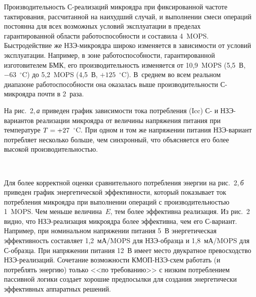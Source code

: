 \begin{multicols}{2}
      
       Производительность С-реализаций микроядра при фиксированной частоте 
тактирования, рассчитанной на наихудший случай, и выполнении смеси операций постоянна для 
всех возможных условий эксплуатации в пределах гарантированной области работоспособности 
и составила 4~MOPS. Быстродействие же НЗЭ-микроядра широко изменяется в зависимости от 
условий эксплуатации. Например, в зоне работоспособности, гарантированной изготовителем 
БМК, его производительность изменяется от 10,9~MOPS (5,5~В, $-63$~$^\circ$C) до 5,2~MOPS 
(4,5~В, $+125$~$^\circ$C). В~среднем во всем реальном диапазоне работоспособности она 
оказалась выше производительности С-мик\-ро\-яд\-ра почти в 2~раза.
       
       На рис.~2,\,\textit{а} приведен график зависимости тока потребления (Icc) С- и НЗЭ-вариантов 
реализации микроядра от величины напряжения питания при температуре 
$T\hm=+27$~$^\circ$C. При одном и том же напряжении питания НЗЭ-ва\-ри\-ант 
потребляет несколько больше, чем синхронный, что объясняется его более высокой 
производительностью.
       
       
      \begin{figure*} %
                   \vspace*{1pt}
 \begin{center}
 \mbox{%
 \epsfxsize=165.286mm
 }
 \end{center}
 \vspace*{-9pt}
      \end{figure*}
      
       Для более корректной оценки сравнительного потребления энергии на рис.~2,\,\textit{б} 
приведен график энергетической эффективности, который показывает ток 
потребления микроядра при выполнении операций с производительностью 1~MOPS. Чем 
меньше величина~$E$, тем более эффективна реализация. Из рис.~2 видно, что 
       НЗЭ-реа\-ли\-за\-ция микроядра более эффективна, чем его С-ва\-ри\-ант. Например, 
при номинальном напряжении питания 5~В энергетическая эффективность составляет 
1,2~мА/MOPS для НЗЭ-образ\-ца и 1,8~мА/MOPS для С-образ\-ца. При напряжении питания 
12~В имеет место двукратное превосходство НЗЭ-реа\-ли\-за\-ций. Сочетание возможности 
КМОП-НЗЭ-схем работать (и потреблять энергию) только <<по требованию>> с низким 
потреблением пассивной логики создает хорошие предпосылки для создания энергетически 
эффективных аппаратных ре\-шений. 
{

}
       

\end{multicols}
